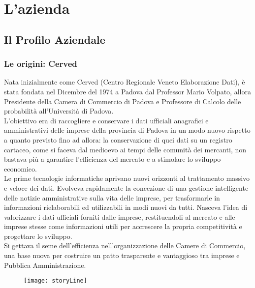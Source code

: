 

\chapter{L'azienda}
\label{cap:azienda}

\section{Il Profilo Aziendale}
\label{sec:il_profilo_aziendale}

	\subsection{Le origini: Cerved}
	Nata inizialmente come Cerved (Centro Regionale Veneto Elaborazione Dati), \nomeAzienda è stata fondata nel Dicembre del 1974 a Padova dal Professor Mario Volpato, allora Presidente della Camera di Commercio di Padova e Professore di Calcolo delle probabilità all'Università di Padova. \\
	L'obiettivo era di raccogliere e conservare i dati ufficiali anagrafici e amministrativi delle imprese della provincia di Padova in un modo nuovo rispetto a quanto previsto fino ad allora: la conservazione di quei dati su un registro cartaceo, come si faceva dal medioevo ai tempi delle comunità dei mercanti, non bastava più a garantire l'efficienza del mercato e a stimolare lo sviluppo economico. \\
	Le prime tecnologie informatiche aprivano nuovi orizzonti al trattamento massivo e veloce dei dati. Evolveva rapidamente la concezione di una gestione intelligente delle notizie amministrative sulla vita delle imprese, per trasformarle in informazioni rielaborabili ed utilizzabili in modi nuovi da tutti. Nasceva l’idea di valorizzare i dati ufficiali forniti dalle imprese, restituendoli al mercato e alle imprese stesse come informazioni utili per accrescere la propria competitività e progettare lo sviluppo.\\
	Si gettava il seme dell’efficienza nell’organizzazione delle Camere di Commercio, una base nuova per costruire un patto trasparente e vantaggioso tra imprese e Pubblica Amministrazione.
	
	\begin{figure}[htbp]
		\begin{center}
			\texttt{[image: storyLine]}
		\end{center}
	\end{figure}
	
